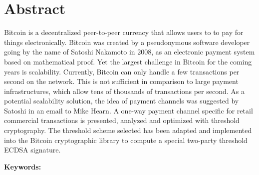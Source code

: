 \chapter*{Abstract}

Bitcoin is a decentralized peer-to-peer currency that allows users to to pay for
things electronically. Bitcoin was created by a pseudonymous software developer
going by the name of Satoshi Nakamoto in 2008, as an electronic payment system
based on mathematical proof. Yet the largest challenge in Bitcoin for the coming
years is scalability. Currently, Bitcoin can only handle a few transactions per
second on the network. This is not sufficient in comparison to large payment
infrastructures, which allow tens of thousands of transactions per second. As a
potential scalability solution, the idea of payment channels was suggested by
Satoshi in an email to Mike Hearn. A one-way payment channel specific for retail
commercial transactions is presented, analyzed and optimized with threshold
cryptography. The threshold scheme selected has been adapted and implemented
into the Bitcoin cryptographic library to compute a special two-party threshold
ECDSA signature.

\vskip0.5cm
\noindent\textbf{Keywords:}
\Keywords

